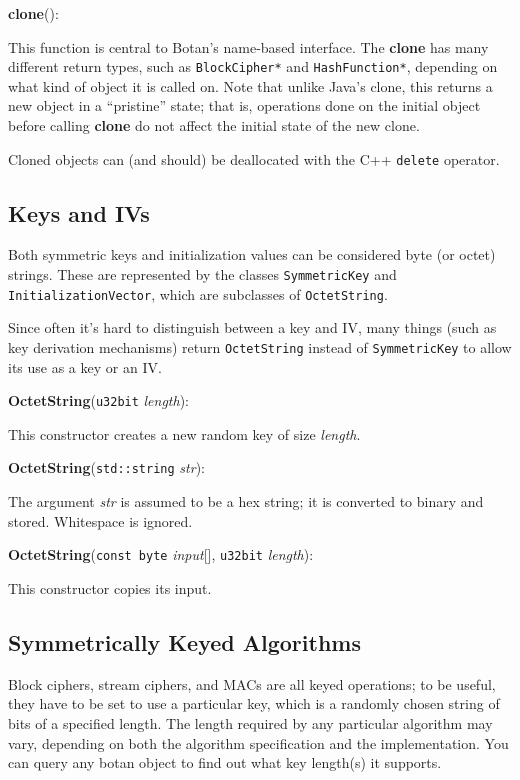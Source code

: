 \documentclass{article}
\newcommand{\function}[1]{\textbf{#1}}
\newcommand{\type}[1]{\texttt{#1}}
\renewcommand{\arg}[1]{\textsl{#1}}
\begin{document}
\noindent
\function{clone}():

This function is central to Botan's name-based interface. The \function{clone}
has many different return types, such as \type{BlockCipher*} and
\type{HashFunction*}, depending on what kind of object it is called on. Note
that unlike Java's clone, this returns a new object in a ``pristine'' state;
that is, operations done on the initial object before calling \function{clone}
do not affect the initial state of the new clone.

Cloned objects can (and should) be deallocated with the C++ \texttt{delete}
operator.

\subsection{Keys and IVs}

Both symmetric keys and initialization values can be considered byte
(or octet) strings. These are represented by the classes
\type{SymmetricKey} and \type{InitializationVector}, which are
subclasses of \type{OctetString}.

Since often it's hard to distinguish between a key and IV, many things (such as
key derivation mechanisms) return \type{OctetString} instead of
\type{SymmetricKey} to allow its use as a key or an IV.

\noindent
\function{OctetString}(\type{u32bit} \arg{length}):

This constructor creates a new random key of size \arg{length}.

\noindent
\function{OctetString}(\type{std::string} \arg{str}):

The argument \arg{str} is assumed to be a hex string; it is converted to binary
and stored. Whitespace is ignored.

\noindent
\function{OctetString}(\type{const byte} \arg{input}[], \type{u32bit}
\arg{length}):

This constructor copies its input.

\subsection{Symmetrically Keyed Algorithms}

Block ciphers, stream ciphers, and MACs are all keyed operations; to
be useful, they have to be set to use a particular key, which is a
randomly chosen string of bits of a specified length.  The length
required by any particular algorithm may vary, depending on both the
algorithm specification and the implementation. You can query any
botan object to find out what key length(s) it supports.
\end{document}
